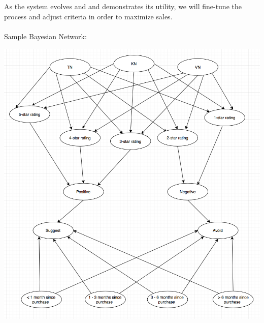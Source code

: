 \documentclass[12pt,a4paper]{article}
\begin{document}
		\\\\
		As the system evolves and and demonstrates its utility, we will fine-tune the process and adjust criteria in order to maximize sales. 
		\\\\
		Sample Bayesian Network:
		\begin{center}
			\includegraphics[width=1\linewidth]{bayes}
		\end{center}
		
\end{document}
